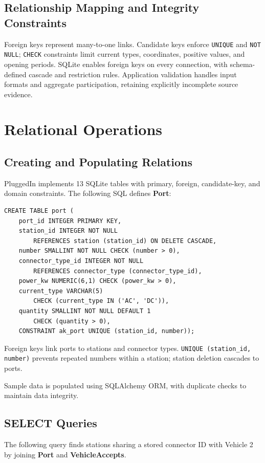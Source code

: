 \documentclass[sigconf,screen,nonacm]{acmart}
\begin{document}
\subsection{Relationship Mapping and Integrity Constraints}
Foreign keys represent many-to-one links. Candidate keys enforce \texttt{UNIQUE} and \texttt{NOT NULL}; \texttt{CHECK} constraints limit current types, coordinates, positive values, and opening periods. SQLite enables foreign keys on every connection, with schema-defined cascade and restriction rules. Application validation handles input formats and aggregate participation, retaining explicitly incomplete source evidence.

\section{Relational Operations}
\subsection{Creating and Populating Relations}
PluggedIn implements 13 SQLite tables with primary, foreign, candidate-key, and domain constraints. The following SQL defines \textbf{Port}:

{\footnotesize
\begin{verbatim}
CREATE TABLE port (
    port_id INTEGER PRIMARY KEY,
    station_id INTEGER NOT NULL
        REFERENCES station (station_id) ON DELETE CASCADE,
    number SMALLINT NOT NULL CHECK (number > 0),
    connector_type_id INTEGER NOT NULL
        REFERENCES connector_type (connector_type_id),
    power_kw NUMERIC(6,1) CHECK (power_kw > 0),
    current_type VARCHAR(5)
        CHECK (current_type IN ('AC', 'DC')),
    quantity SMALLINT NOT NULL DEFAULT 1
        CHECK (quantity > 0),
    CONSTRAINT ak_port UNIQUE (station_id, number));
\end{verbatim}
}

Foreign keys link ports to stations and connector types. \texttt{UNIQUE (station\_id, number)} prevents repeated numbers within a station; station deletion cascades to ports.

Sample data is populated using SQLAlchemy ORM, with duplicate checks to maintain data integrity.

\subsection{SELECT Queries}
The following query finds stations sharing a stored connector ID with Vehicle 2 by joining \textbf{Port} and \textbf{VehicleAccepts}.
\end{document}
